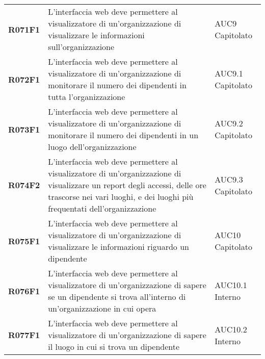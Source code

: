 \documentclass[../analisi-dei-requisiti.tex]{subfiles}
\begin{document}
\begin{longtable}[H]{>{\centering\bfseries}m{3cm} >{\centering}m{10cm} >{\centering\arraybackslash}m{3cm}}
  R071F1                               & L'interfaccia web deve permettere al visualizzatore di un'organizzazione di visualizzare le informazioni sull'organizzazione                                                                            & AUC9 Capitolato               \\
  R072F1                               & L'interfaccia web deve permettere al visualizzatore di un'organizzazione di monitorare il numero dei dipendenti in tutta l'organizzazione                                                               & AUC9.1 Capitolato             \\
  R073F1                               & L'interfaccia web deve permettere al visualizzatore di un'organizzazione di monitorare il numero dei dipendenti in un luogo dell'organizzazione                                                         & AUC9.2 Capitolato             \\
  R074F2                               & L'interfaccia web deve permettere al visualizzatore di un'organizzazione di visualizzare un report degli accessi, delle ore trascorse nei vari luoghi, e dei luoghi più frequentati dell'organizzazione & AUC9.3 Capitolato             \\
  R075F1                               & L'interfaccia web deve permettere al visualizzatore di un'organizzazione di visualizzare le informazioni riguardo un dipendente                                                                         & AUC10 Capitolato               \\
  R076F1                               & L'interfaccia web deve permettere al visualizzatore di un'organizzazione di sapere se un dipendente si trova all'interno di un'organizzazione in cui opera                                              & AUC10.1 Interno                \\
  R077F1                               & L'interfaccia web deve permettere al visualizzatore di un'organizzazione di sapere il luogo in cui si trova un dipendente                                                                               & AUC10.2 Interno                \\


\end{longtable}
\end{document}
